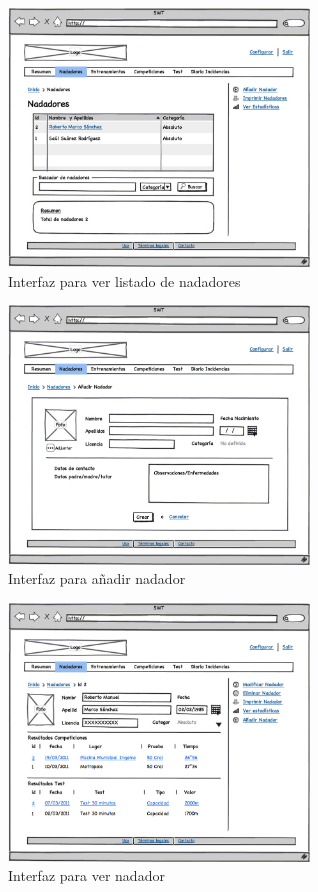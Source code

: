 	\begin{figure}[H]
	  \centering
	    \includegraphics[width=8cm]{./eps/p_interfaz/10_Nadadores.eps}
	  \caption{Interfaz para ver listado de nadadores}
	  \label{fig:interfaz_nadadores}
	\end{figure}
	
	\begin{figure}[H]
	  \centering
	    \includegraphics[width=8cm]{./eps/p_interfaz/11_Nadadores_new.eps}
	  \caption{Interfaz para añadir nadador}
	  \label{fig:interfaz_nadadores_new}
	\end{figure}
	
	\begin{figure}[H]
	  \centering
	    \includegraphics[width=8cm]{./eps/p_interfaz/12_Nadadores_show.eps}
	  \caption{Interfaz para ver nadador}
	  \label{fig:interfaz_nadadores_show}
	\end{figure}
	
